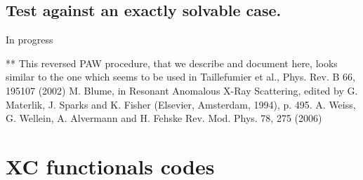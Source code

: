 \documentclass[a4paper,11pt]{report}
\begin{document}
\section{Test against an exactly solvable case.}
 
In progress

\appendix
  
\begin{thebibliography}{0}
** This reversed PAW procedure, that we describe and document here, looks similar to the one which seems to be  used in Taillefumier et al., Phys. Rev. B 66, 195107 (2002) 
   M. Blume, in Resonant Anomalous X-Ray Scattering, edited by G. Materlik, J. Sparks and K. Fisher (Elsevier, Amsterdam, 1994), p. 495.
 A. Weiss, G. Wellein, A. Alvermann and H. Fehske Rev. Mod. Phys. 78, 275 (2006) 
\end{thebibliography}


\chapter{XC functionals codes}
\end{document}
